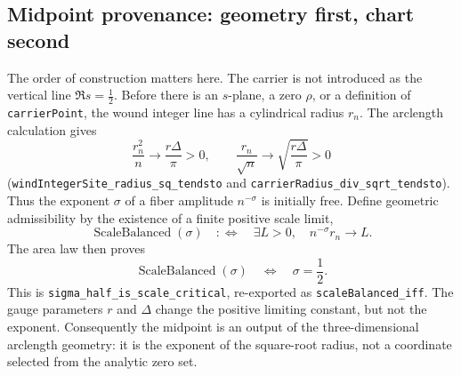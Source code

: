 
\subsection{Midpoint provenance: geometry first, chart second}
\label{sec:grh-midpoint-provenance}

The order of construction matters here.  The carrier is not introduced as
the vertical line \(\Re s=\tfrac12\).  Before there is an \(s\)-plane, a
zero \(\rho\), or a definition of \texttt{carrierPoint}, the wound integer
line has a cylindrical radius \(r_n\).  The arclength calculation gives
\[
  \frac{r_n^2}{n}\longrightarrow \frac{r\Delta}{\pi}>0,
  \qquad
  \frac{r_n}{\sqrt n}\longrightarrow
     \sqrt{\frac{r\Delta}{\pi}}>0
\]
(\texttt{windIntegerSite\_radius\_sq\_tendsto} and
\texttt{carrierRadius\_div\_sqrt\_tendsto}).  Thus the exponent
\(\sigma\) of a fiber amplitude \(n^{-\sigma}\) is initially free.  Define
geometric admissibility by the existence of a finite positive scale limit,
\[
 \operatorname{ScaleBalanced}(\sigma)
 \quad:\Longleftrightarrow\quad
 \exists L>0,
 \quad n^{-\sigma}r_n\longrightarrow L.
\]
The area law then proves
\[
 \operatorname{ScaleBalanced}(\sigma)
 \quad\Longleftrightarrow\quad
 \sigma=\frac12.
 \tag{MP1}\label{eq:grh-midpoint-area-law}
\]
This is \texttt{sigma\_half\_is\_scale\_critical}, re-exported as
\texttt{scaleBalanced\_iff}.  The gauge parameters \(r\) and \(\Delta\)
change the positive limiting constant, but not the exponent.  Consequently
the midpoint is an output of the three-dimensional arclength geometry: it
is the exponent of the square-root radius, not a coordinate selected from
the analytic zero set.

